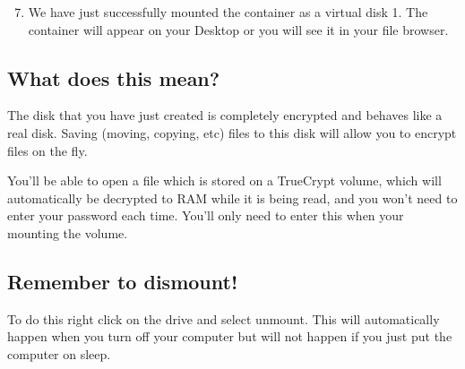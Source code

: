\begin{enumerate}[1.]
\setcounter{enumi}{6}
\item
  We have just successfully mounted the container as a virtual disk 1.
  The container will appear on your Desktop or you will see it in your
  file browser.
\end{enumerate}
\subsection{What does this mean?}

The disk that you have just created is completely encrypted and behaves
like a real disk. Saving (moving, copying, etc) files to this disk will
allow you to encrypt files on the fly.

You'll be able to open a file which is stored on a TrueCrypt volume,
which will automatically be decrypted to RAM while it is being read, and
you won't need to enter your password each time. You'll only need to
enter this when your mounting the volume.

\subsection{Remember to dismount!}

To do this right click on the drive and select unmount. This will
automatically happen when you turn off your computer but will not happen
if you just put the computer on sleep.
